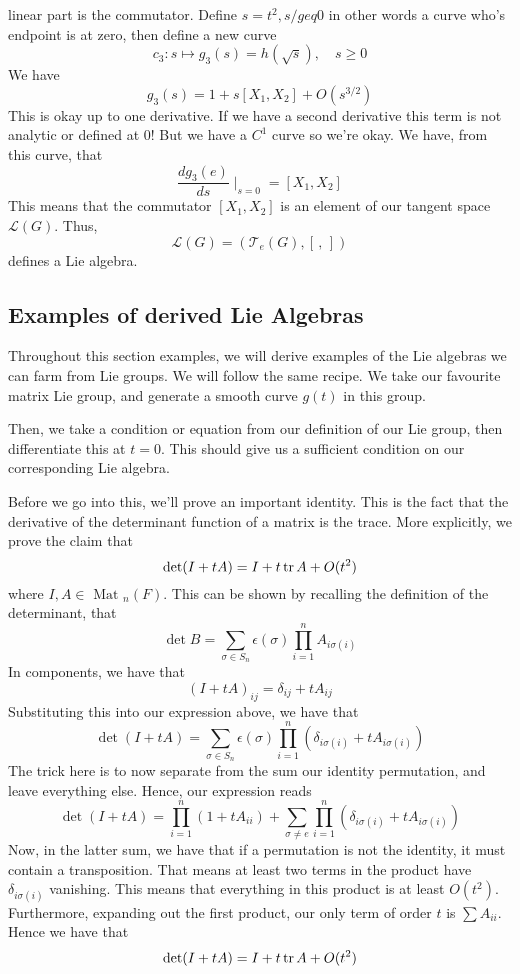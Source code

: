 \documentclass[11pt, oneside]{article}   	%
\theoremstyle{slanted}
\begin{document}
linear part is the commutator. Define $ s = t^2 , s /geq 0 $ 
in other words a curve who's endpoint is at zero, then 
define a new curve 
\[
c_3 : s \mapsto g_3 ( s)  = h ( \sqrt{ s } ), \quad s \ge  0 
\] We have 
\[
g_3 (s)  = 1 + s [ X_1, X_2 ] + O ( s^{ 3 /2 } ) 
\] This is okay up to one derivative. If we have a second derivative
this term is not analytic or defined at 0! But we have a $ C^1 $ curve so we're 
okay. We have, from this curve, that 
\[
\frac{ d g_3 ( e) }{ ds } \mid_{ s  = 0}  = [ X_1 , X_2 ] 
\] This means that the commutator $ [ X_1 , X_2 ] $ is an element of our 
tangent space $ \mathcal{ L } ( G ) $. Thus, 
\[
\mathcal{ L } ( G ) = ( \mathcal{ T }_ e ( G ) , [ \, , \, ] ) 
\] defines a Lie algebra. 

\pagebreak
\subsection{Examples of derived Lie Algebras}
Throughout this section examples, we will derive examples of 
the Lie algebras we can farm from Lie groups. 
We will follow the same recipe. We take our favourite 
matrix Lie group, and generate a smooth curve $ g ( t) $ 
in this group. 

Then, we take a condition or equation from our definition of 
our Lie group, then differentiate this at $ t = 0$. 
This should give us a sufficient condition on our corresponding 
Lie algebra.

Before we go into this, we'll prove an important identity. 
This is the fact that the derivative of the determinant 
function of a matrix is the trace.
More explicitly, we prove the claim that 
\[
 \det ( I + t A ) = I + t \tr A + O ( t^ 2 ) 
\] where $ I, A \in \text{ Mat } _ n  ( F) $.
This can be shown by recalling the definition of the determinant,
that 
\[
	\det B = \sum_{ \sigma \in S _ n } \epsilon ( \sigma ) \prod_{ i = 1 } ^ n A _{ i \sigma ( i ) }
\] In components, 
we have that 
\[
 ( I + t A)_{ ij } =  \delta_{ ij } + t A_{ ij }
\] Substituting this into our expression above, 
we have that 
\[
	\det ( I + tA )  = \sum_{ \sigma \in S_n } \epsilon ( \sigma) \prod_{ i =1 } ^ n ( \delta_{ i \sigma ( i ) } + t A_{ i \sigma ( i ) } ) 
\] The trick here is to now separate from the sum our 
identity permutation, and leave everything else. 
Hence, our expression reads 
\[
	\det ( I + t A )  = \prod_{ i = 1 } ^ n ( 1 + t A_{ ii } ) + \sum_{ \sigma \neq e } \prod_{ i = 1 } ^ n ( \delta_{ i \sigma ( i ) } + t A_{ i \sigma ( i ) } ) 
\] Now, in the latter sum, we have that 
if a permutation is not the identity, it must 
contain a transposition. That means at least two terms in the product 
have $ \delta_{ i \sigma ( i ) }  $ vanishing. This means that 
everything in this product is at least $ O ( t^ 2 ) $. 
Furthermore, expanding out the first product, our only term 
of order  $ t $ is $ \sum A_{ ii } $. Hence we have that 
\[
 \det ( I + t A ) = I + t \tr A + O ( t^ 2 )
\] 
\end{document}

